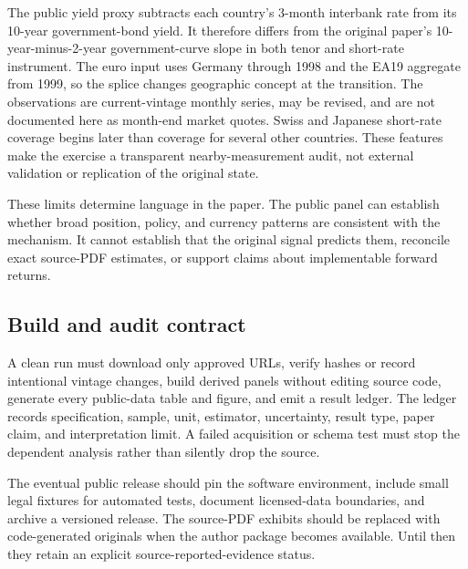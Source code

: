 The public yield proxy subtracts each country's 3-month interbank rate from its 10-year government-bond yield. It therefore differs from the original paper's 10-year-minus-2-year government-curve slope in both tenor and short-rate instrument. The euro input uses Germany through 1998 and the EA19 aggregate from 1999, so the splice changes geographic concept at the transition. The observations are current-vintage monthly series, may be revised, and are not documented here as month-end market quotes. Swiss and Japanese short-rate coverage begins later than coverage for several other countries. These features make the exercise a transparent nearby-measurement audit, not external validation or replication of the original state.

These limits determine language in the paper. The public panel can establish whether broad position, policy, and currency patterns are consistent with the mechanism. It cannot establish that the original signal predicts them, reconcile exact source-PDF estimates, or support claims about implementable forward returns.

\subsection{Build and audit contract}

A clean run must download only approved URLs, verify hashes or record intentional vintage changes, build derived panels without editing source code, generate every public-data table and figure, and emit a result ledger. The ledger records specification, sample, unit, estimator, uncertainty, result type, paper claim, and interpretation limit. A failed acquisition or schema test must stop the dependent analysis rather than silently drop the source.

The eventual public release should pin the software environment, include small legal fixtures for automated tests, document licensed-data boundaries, and archive a versioned release. The source-PDF exhibits should be replaced with code-generated originals when the author package becomes available. Until then they retain an explicit source-reported-evidence status.
